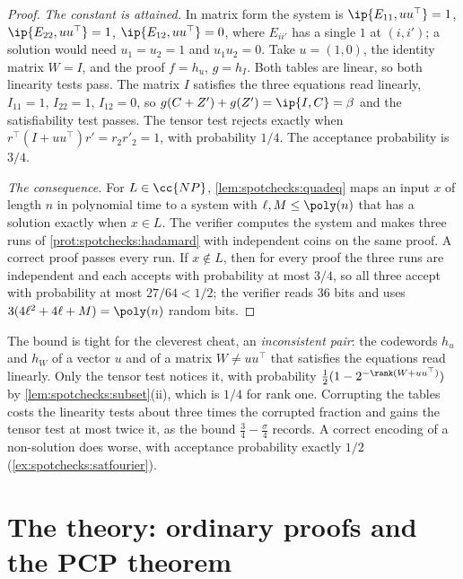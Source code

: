 \begin{refsection}
\begin{proof}
\emph{The constant is attained.} In matrix form the system is $\ip{E_{11},uu^\top}=1$, $\ip{E_{22},uu^\top}=1$, $\ip{E_{12},uu^\top}=0$, where $E_{ii'}$ has a single $1$ at $(i,i')$; a solution would need $u_1=u_2=1$ and $u_1u_2=0$. Take $u=(1,0)$, the identity matrix $W=I$, and the proof $f=h_u$, $g=h_I$. Both tables are linear, so both linearity tests pass. The matrix $I$ satisfies the three equations read linearly, $I_{11}=1$, $I_{22}=1$, $I_{12}=0$, so $g(C+Z')+g(Z')=\ip{I,C}=\beta$ and the satisfiability test passes. The tensor test rejects exactly when $r^\top(I+uu^\top)r'=r_2r'_2=1$, with probability $1/4$. The acceptance probability is $3/4$.

\emph{The consequence.} For $L\in\cc{NP}$, \cref{lem:spotchecks:quadeq} maps an input $x$ of length $n$ in polynomial time to a system with $\ell,M\le\poly(n)$ that has a solution exactly when $x\in L$. The verifier computes the system and makes three runs of \cref{prot:spotchecks:hadamard} with independent coins on the same proof. A correct proof passes every run. If $x\notin L$, then for every proof the three runs are independent and each accepts with probability at most $3/4$, so all three accept with probability at most $27/64<1/2$; the verifier reads $36$ bits and uses $3(4\ell^2+4\ell+M)=\poly(n)$ random bits.
\end{proof}

The bound is tight for the cleverest cheat, an \emph{inconsistent pair}: the codewords $h_u$ and $h_W$ of a vector $u$ and of a matrix $W\ne uu^\top$ that satisfies the equations read linearly. Only the tensor test notices it, with probability $\frac12(1-2^{-\rank(W+uu^\top)})$ by \cref{lem:spotchecks:subset}(ii), which is $1/4$ for rank one. Corrupting the tables costs the linearity tests about three times the corrupted fraction and gains the tensor test at most twice it, as the bound $\frac34-\frac\sigma4$ records. A correct encoding of a non-solution does worse, with acceptance probability exactly $1/2$ (\cref{ex:spotchecks:satfourier}).

\section{The theory: ordinary proofs and the PCP theorem}\label{sec:spotchecks:pcptheorem}


\end{refsection}
